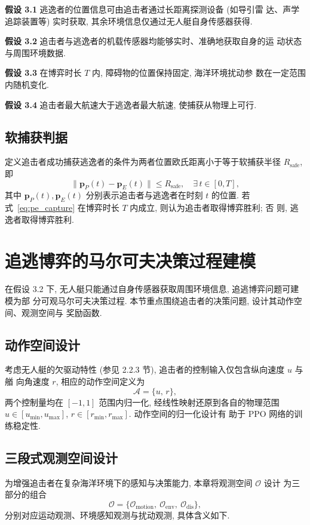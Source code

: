 \textbf{假设 3.1} \quad 逃逸者的位置信息可由追击者通过长距离探测设备 (如导引雷
达、声学追踪装置等) 实时获取, 其余环境信息仅通过无人艇自身传感器获得.

\textbf{假设 3.2} \quad 追击者与逃逸者的机载传感器均能够实时、准确地获取自身的运
动状态与周围环境数据.

\textbf{假设 3.3} \quad 在博弈时长 $T$ 内, 障碍物的位置保持固定, 海洋环境扰动参
数在一定范围内随机变化.

\textbf{假设 3.4} \quad 追击者最大航速大于逃逸者最大航速, 使捕获从物理上可行.

\subsection{软捕获判据}
\label{subsec:soft_capture}
定义追击者成功捕获逃逸者的条件为两者位置欧氏距离小于等于软捕获半径
$R_{\mathrm{safe}}$, 即
\begin{equation}
\| \mathbf{p}_P(t) - \mathbf{p}_E(t) \| \le R_{\mathrm{safe}}, \quad \exists\, t\in[0,T],
\label{eq:pe_capture}
\end{equation}
其中 $\mathbf{p}_P(t), \mathbf{p}_E(t)$ 分别表示追击者与逃逸者在时刻 $t$ 的位置.
若式~\eqref{eq:pe_capture} 在博弈时长 $T$ 内成立, 则认为追击者取得博弈胜利; 否
则, 逃逸者取得博弈胜利.

\section{追逃博弈的马尔可夫决策过程建模}
\label{sec:pe_mdp}
在假设 3.2 下, 无人艇只能通过自身传感器获取周围环境信息, 追逃博弈问题可建模为部
分可观马尔可夫决策过程. 本节重点围绕追击者的决策问题, 设计其动作空间、观测空间与
奖励函数.

\subsection{动作空间设计}
\label{subsec:pe_action}
考虑无人艇的欠驱动特性 (参见 2.2.3 节), 追击者的控制输入仅包含纵向速度 $u$ 与艏
向角速度 $r$, 相应的动作空间定义为
\begin{equation}
\mathcal{A} = \{u,\, r\},
\label{eq:pe_action_space}
\end{equation}
两个控制量均在 $[-1, 1]$ 范围内归一化, 经线性映射还原到各自的物理范围
$u\in[u_{\min}, u_{\max}]$, $r\in[r_{\min}, r_{\max}]$. 动作空间的归一化设计有
助于 PPO 网络的训练稳定性.

\subsection{三段式观测空间设计}
\label{subsec:pe_obs}
为增强追击者在复杂海洋环境下的感知与决策能力, 本章将观测空间 $\mathcal{O}$ 设计
为三部分的组合
\begin{equation}
\mathcal{O} = \{\mathcal{O}_{\mathrm{motion}},\ \mathcal{O}_{\mathrm{env}},\ \mathcal{O}_{\mathrm{dis}}\},
\label{eq:pe_obs_space}
\end{equation}
分别对应运动观测、环境感知观测与扰动观测, 具体含义如下.

